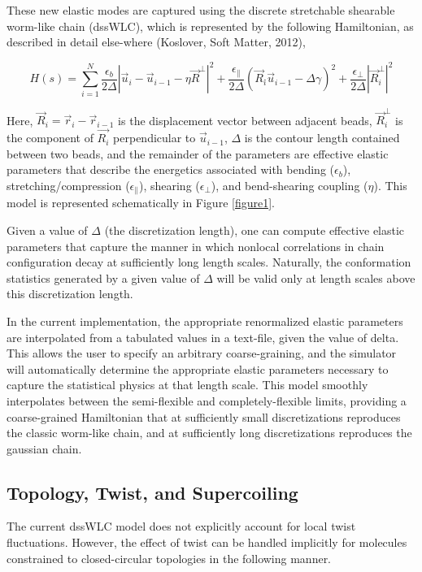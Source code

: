 \documentclass[english]{article}
\begin{document}
 These new elastic modes are captured using the discrete stretchable shearable worm-like chain (dssWLC), which is represented by the following Hamiltonian, as described in detail else-where (Koslover, Soft Matter, 2012),

\begin{equation}
H(s)=\sum_{i=1}^{N}\frac{\epsilon_b}{2\Delta}|\vec{u}_i-\vec{u}_{i-1}-\eta\vec{R}^{\perp}|^2+\frac{\epsilon_{\parallel}}{2\Delta}(\vec{R}_i\dot{}\vec{u}_{i-1}-\Delta\gamma)^2 +\frac{\epsilon_{\perp}}{2\Delta}|\vec{R}_i^{\perp}|^2
\label{dssWLC}
\end{equation}

Here, $\vec{R}_i=\vec{r}_i-\vec{r}_{i-1}$ is the displacement vector between adjacent beads, $\vec{R}_i^{\perp}$ is the component of $\vec{R_i}$ perpendicular to $\vec{u}_{i-1}$, $\Delta$ is the contour length contained between two beads, and the remainder of the parameters are effective elastic parameters that describe the energetics associated with bending ($\epsilon_b$), stretching/compression ($\epsilon_{\parallel}$), shearing ($\epsilon_{\perp}$), and bend-shearing coupling ($\eta$). This model is represented schematically in Figure \ref{figure1}.


Given a value of $\Delta$ (the discretization length), one can compute effective elastic parameters that capture the manner in which nonlocal correlations in chain configuration decay at sufficiently long length scales. Naturally, the conformation statistics generated by a given value of $\Delta$ will be valid only at length scales above this discretization length.

In the current implementation, the appropriate renormalized elastic parameters are interpolated from a tabulated values in a text-file, given the value of delta. This allows the user to specify an arbitrary coarse-graining, and the simulator will automatically determine the appropriate elastic parameters necessary to capture the statistical physics at that length scale. This model smoothly interpolates between the semi-flexible and completely-flexible limits, providing a coarse-grained Hamiltonian that at sufficiently small discretizations reproduces the classic worm-like chain, and at sufficiently long discretizations reproduces the gaussian chain.

\subsection{Topology, Twist, and Supercoiling}
The current dssWLC model does not explicitly account for local twist fluctuations. However, the effect of twist can be handled implicitly for molecules constrained to closed-circular topologies in the following manner.
\end{document}
